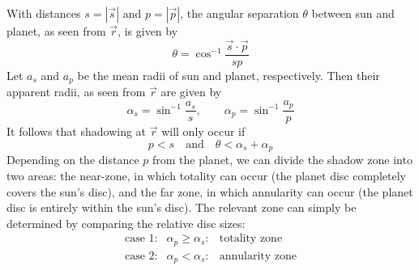 \documentclass[Orbiter Technical Reference.tex]{subfiles}
\begin{document}
With distances $s = |\vec{s}|$ and $p = |\vec{p}|$, the angular separation $\theta$ between sun and planet, as seen from $\vec{r}$, is given by
\begin{equation}
\theta = \cos^{-1} \frac{\vec{s} \cdot \vec{p}}{sp}
\end{equation}
Let $a_s$ and $a_p$ be the mean radii of sun and planet, respectively. Then their apparent radii, as seen from $\vec{r}$ are given by
\begin{equation}
\alpha_s = \sin^{-1} \frac{a_s}{s}, \qquad \alpha_p = \sin^{-1} \frac{a_p}{p}
\end{equation}
It follows that shadowing at $\vec{r}$ will only occur if
\begin{equation}
p < s \quad \text{and} \quad \theta < \alpha_s + \alpha_p
\end{equation}
Depending on the distance $p$ from the planet, we can divide the shadow zone into two areas: the near-zone, in which totality can occur (the planet disc completely covers the sun's disc), and the far zone, in which annularity can occur (the planet disc is entirely within the sun's disc).
The relevant zone can simply be determined by comparing the relative disc sizes:\begin{equation}\label{eq:shadowzone}
\begin{array}{lcl}
\text{case 1:} & \alpha_p \geq \alpha_s: & \text{totality zone}\\
\text{case 2:} & \alpha_p < \alpha_s: & \text{annularity zone}
\end{array}
\end{equation}
\end{document}
